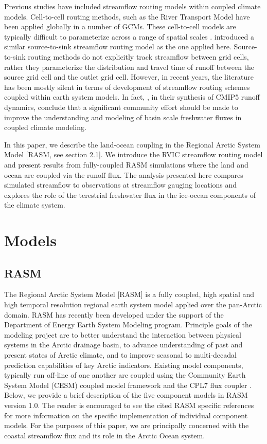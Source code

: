 \documentclass[jgrga, draft]{agutex}
\begin{document}
\begin{article}
Previous studies have included streamflow routing models within coupled climate models.
Cell-to-cell routing methods, such as the River Transport Model \citep[RTM][]{Branstetter_2003} have been applied globally in a number of GCMs.
These cell-to-cell models are typically difficult to parameterize across a range of spatial scales \citep{Sushama_2004}.
\citep{Olivera_2000} introduced a similar source-to-sink streamflow routing model as the one applied here.
Source-to-sink routing methods do not explicitly track streamflow between grid cells, rather they parameterize the distribution and travel time of runoff between the source grid cell and the outlet grid cell.
However, in recent years, the literature has been mostly silent in terms of development of streamflow routing schemes coupled within earth system models.
In fact, \citet{Bring_2015}, in their synthesis of CMIP5 runoff dynamics, conclude that a significant community effort should be made to improve the understanding and modeling of basin scale freshwater fluxes in coupled climate modeling.

In this paper, we describe the land-ocean coupling in the Regional Arctic System Model [RASM, see section 2.1].
We introduce the RVIC streamflow routing model and present results from fully-coupled RASM simulations where the land and ocean are coupled via the runoff flux.
The analysis presented here compares simulated streamflow to observations at streamflow gauging locations and explores the role of the terestrial freshwater flux in the ice-ocean components of the climate system.

\section{Models}

\subsection{RASM}

The Regional Arctic System Model [RASM] is a fully coupled, high spatial and high temporal resolution regional earth system model applied over the pan-Arctic domain.
RASM has recently been developed under the support of the Department of Energy Earth System Modeling program.
Principle goals of the modeling project are to better understand the interaction between physical systems in the Arctic drainage basin, to advance understanding of past and present states of Arctic climate, and to improve seasonal to multi-decadal prediction capabilities of key Arctic indicators.
Existing model components, typically run off-line of one another are coupled using the Community Earth System Model (CESM) coupled model framework and the CPL7 flux coupler \citep{Craig_2011}.
Below, we provide a brief description of the five component models in RASM version 1.0.
The reader is encouraged to see the cited RASM specific references for more information on the specific implementation of individual component models.
For the purposes of this paper, we are principally concerned with the coastal streamflow flux and its role in the Arctic Ocean system.


\end{article}
\end{document}
